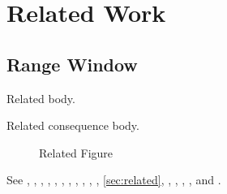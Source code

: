 \section[Related Short]{Related Work}\label{sec:related}
\subsection{Range Window}\label{sub:related}
\begin{oblemma}\label{obs:related}
Related body.
\end{oblemma}
\begin{obcor}\label{obc:related}
Related consequence body.
\end{obcor}
\begin{figure}\caption[Related Short]{Related Figure}\label{fig:related}\end{figure}
See , , , , , , , , , , , \vref{sec:related}, , , , , and .
